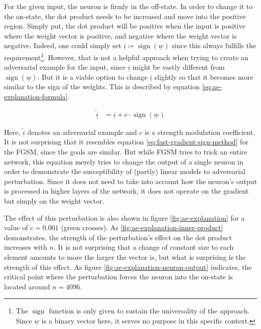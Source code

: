 \documentclass[11pt, a4paper]{article}
\newcommand\braces[1]{\left(#1\right)}
\renewcommand{\vec}[1]{\underline{#1}}
\DeclareMathOperator{\sign}{sign}
\begin{document}

For the given input, the neuron is firmly in the off-state. In order to change it to the on-state, the dot product needs to be increased and move into the positive region. Simply put, the dot product will be positive when the input is positive where the weight vector is positive, and negative where the weight vector is negative. Indeed, one could simply set $\vec{i} \coloneqq \sign \braces{\vec{w}}$ since this always fulfills the requirement\footnote{The $\sign$ function is only given to sustain the universality of the approach. Since $\vec{w}$ is a binary vector here, it serves no purpose in this specific context.}. However, that is not a helpful approach when trying to create an adversarial example for the input, since $\vec{i}$ might be vastly different from $\sign \braces{\vec{w}}$. But it is a viable option to change $\vec{i}$ slightly so that it becomes more similar to the sign of the weights. This is described by equation \eqref{eq:ae-explanation-formula}.

\begin{align}
	\vec{\hat i}&= \vec{i} + c \cdot \sign \braces{\vec{w}} \label{eq:ae-explanation-formula}
\end{align}

Here, $\vec{\hat i}$ denotes an adversarial example and $c$ is a strength modulation coefficient. It is not surprising that it resembles equation \eqref{eq:fast-gradient-sign-method} for the FGSM, since the goals are similar. But while FGSM tries to trick an entire network, this equation merely tries to change the output of a single neuron in order to demonstrate the susceptibility of (partly) linear models to adversarial perturbation. Since it does not need to take into account how the neuron's output is processed in higher layers of the network, it does not operate on the gradient but simply on the weight vector.

The effect of this perturbation is also shown in figure \ref{fig:ae-explanation} for a value of $c = 0.001$ (green crosses). As \ref{fig:ae-explanation-inner-product} demonstrates, the strength of the perturbation's effect on the dot product increases with $n$. It is not surprising that a change of constant size to each element amounts to more the larger the vector is, but what is surprising is the strength of this effect. As figure \ref{fig:ae-explanation-neuron-output} indicates, the critical point where the perturbation forces the neuron into the on-state is located around $n = 4096$.
\end{document}
